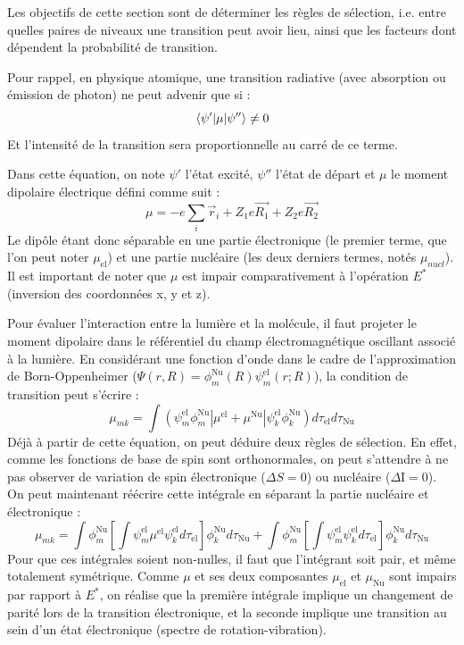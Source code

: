 Les objectifs de cette section sont de déterminer les règles de sélection, i.e. entre quelles paires de niveaux une transition peut avoir lieu, ainsi que les facteurs dont dépendent la probabilité de transition.


Pour rappel, en physique atomique, une transition radiative (avec absorption ou émission de photon) ne peut advenir que si :
\[
\mel{\psi'}{\mu}{\psi''} \neq 0
\]
Et l'intensité de la transition sera proportionnelle au carré de ce terme.


Dans cette équation, on note $\psi'$ l'état excité, $\psi''$ l'état de départ et $\mu$ le moment dipolaire électrique défini comme suit :
\[
\mu = -e\sum\limits_i\Vec{r}_i + Z_1e\Vec{R_1} + Z_2e\Vec{R_2}
\]
Le dipôle étant donc séparable en une partie électronique (le premier terme, que l'on peut noter $\mu_\text{el}$) et une partie nucléaire (les deux derniers termes, notés $\mu_{nucl}$). Il est important de noter que $\mu$ est impair comparativement à l'opération $E^*$ (inversion des coordonnées x, y et z).


Pour évaluer l'interaction entre la lumière et la molécule, il faut projeter le moment dipolaire dans le référentiel du champ électromagnétique oscillant associé à la lumière. En considérant une fonction d'onde dans le cadre de l'approximation de Born-Oppenheimer ($\Psi(r,R) = \phi^\text{Nu}_m(R)\psi^\text{el}_m(r;R)$), la condition de transition peut s'écrire :
\[
\mu_{mk} = \int (\psi^\text{el}_m\phi^\text{Nu}_m|\mu^\text{el} + \mu^\text{Nu}|\psi^\text{el}_k\phi^\text{Nu}_k)d\tau_\text{el}d\tau_\text{Nu}
\]
Déjà à partir de cette équation, on peut déduire deux règles de sélection. En effet, comme les fonctions de base de spin sont orthonormales, on peut s'attendre à ne pas observer de variation de spin électronique ($\Delta S = 0$) ou nucléaire ($\Delta $I$ =0$). On peut maintenant réécrire cette intégrale en séparant la partie nucléaire et électronique :
\[
\mu_{mk} = \int \phi^\text{Nu}_m\left[\int \psi^\text{el}_m\mu^\text{el}\psi^\text{el}_kd\tau_\text{el} \right]\phi^\text{Nu}_kd\tau_\text{Nu} + \int \phi^\text{Nu}_m\left[\int \psi^\text{el}_m\psi^\text{el}_kd\tau_\text{el} \right]\phi^\text{Nu}_kd\tau_\text{Nu}
\]
Pour que ces intégrales soient non-nulles, il faut que l'intégrant soit pair, et même totalement symétrique. Comme $\mu$ et ses deux composantes $\mu_\text{el}$ et $\mu_\text{Nu}$ sont impairs par rapport à $E^*$, on réalise que la première intégrale implique un changement de parité lors de la transition électronique, et la seconde implique une transition au sein d'un état électronique (spectre de rotation-vibration).


